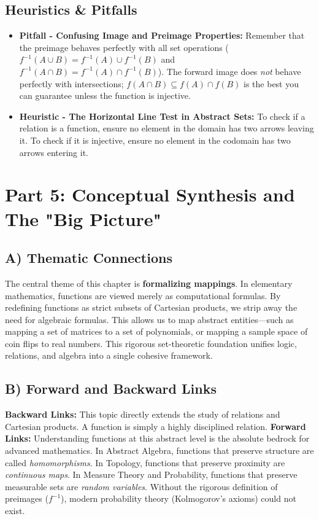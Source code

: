 \documentclass[11pt, a4paper]{article}
\theoremstyle{definition}
\theoremstyle{remark}
\begin{document}
\subsection{Heuristics \& Pitfalls}
\begin{itemize}
    \item \textbf{Pitfall - Confusing Image and Preimage Properties:} Remember that the preimage behaves perfectly with all set operations ($f^{-1}(A \cup B) = f^{-1}(A) \cup f^{-1}(B)$ and $f^{-1}(A \cap B) = f^{-1}(A) \cap f^{-1}(B)$). The forward image does \textit{not} behave perfectly with intersections; $f(A \cap B) \subseteq f(A) \cap f(B)$ is the best you can guarantee unless the function is injective.
    \item \textbf{Heuristic - The Horizontal Line Test in Abstract Sets:} To check if a relation is a function, ensure no element in the domain has two arrows leaving it. To check if it is injective, ensure no element in the codomain has two arrows entering it.
\end{itemize}

\newpage
\section{Part 5: Conceptual Synthesis and The "Big Picture"}

\subsection{A) Thematic Connections}
The central theme of this chapter is \textbf{formalizing mappings}. In elementary mathematics, functions are viewed merely as computational formulas. By redefining functions as strict subsets of Cartesian products, we strip away the need for algebraic formulas. This allows us to map abstract entities—such as mapping a set of matrices to a set of polynomials, or mapping a sample space of coin flips to real numbers. This rigorous set-theoretic foundation unifies logic, relations, and algebra into a single cohesive framework.

\subsection{B) Forward and Backward Links}
\textbf{Backward Links:} This topic directly extends the study of relations and Cartesian products. A function is simply a highly disciplined relation. 
\textbf{Forward Links:} Understanding functions at this abstract level is the absolute bedrock for advanced mathematics. In Abstract Algebra, functions that preserve structure are called \textit{homomorphisms}. In Topology, functions that preserve proximity are \textit{continuous maps}. In Measure Theory and Probability, functions that preserve measurable sets are \textit{random variables}. Without the rigorous definition of preimages ($f^{-1}$), modern probability theory (Kolmogorov's axioms) could not exist.
\end{document}
